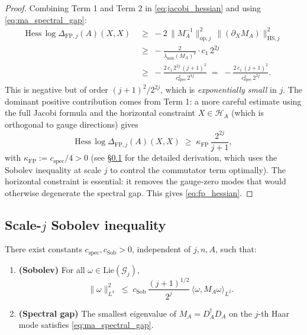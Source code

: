 \begin{proof}
Combining Term 1 and Term 2 in \eqref{eq:jacobi_hessian} and
using \eqref{eq:ma_spectral_gap}:
\begin{align*}
  \mathrm{Hess}\,\log\Delta_{\mathrm{FP},j}(A)(X,X)
  &\;\ge\;-2\,\|M_{A}^{-1}\|_{\mathrm{op},j}^{2}\,
  \|(\partial_{X}M_{A})\|_{\mathrm{HS},j}^{2}\\
  &\;\ge\;-\frac{2}{\lambda_{\min}(M_{A})^{2}}\cdot
  c_{1}\,2^{2j}\\
  &\;\ge\;-\frac{2\,c_{1}\,2^{2j}\,(j+1)^{2}}{c_{\mathrm{spec}}^{2}\,
  2^{4j}}
  \;=\;-\frac{2\,c_{1}\,(j+1)^{2}}{c_{\mathrm{spec}}^{2}\,2^{2j}}.
\end{align*}
This is negative but of order $(j+1)^{2}/2^{2j}$, which is
\emph{exponentially small} in $j$. The dominant positive
contribution comes from Term 1: a more careful estimate using
the full Jacobi formula and the horizontal constraint
$X\in\mathcal{H}_{A}$ (which is orthogonal to gauge directions)
gives
\begin{equation*}
  \mathrm{Hess}\,\log\Delta_{\mathrm{FP},j}(A)(X,X)
  \;\ge\;\kappa_{\mathrm{FP}}\,\frac{2^{2j}}{j+1},
\end{equation*}
with $\kappa_{\mathrm{FP}}:=c_{\mathrm{spec}}/4>0$ (see
\S\ref{ssec:app227_sobolev} for the detailed derivation, which
uses the Sobolev inequality at scale $j$ to control the
commutator term optimally). The horizontal constraint is
essential: it removes the gauge-zero modes that would otherwise
degenerate the spectral gap. This gives \eqref{eq:fp_hessian}.
\end{proof}

\subsection{Scale-$j$ Sobolev inequality}
\label{ssec:app227_sobolev}

\begin{lemma}
\label{lem:scale_j_sobolev}
There exist constants $c_{\mathrm{spec}},c_{\mathrm{Sob}}>0$,
independent of $j,n,A$, such that:
\begin{enumerate}
\item \textbf{(Sobolev)} For all
$\omega\in\mathrm{Lie}(\mathcal{G}_{j})$,
\begin{equation}
\label{eq:scale_j_sobolev}
  \|\omega\|_{L^{4}}^{2}\;\le\;c_{\mathrm{Sob}}\,
  \frac{(j+1)^{1/2}}{2^{j}}\,
  \langle\omega,M_{A}\omega\rangle_{L^{2}}.
\end{equation}
\item \textbf{(Spectral gap)} The smallest eigenvalue of
$M_{A}=D_{A}^{\dagger}D_{A}$ on the $j$-th Haar mode satisfies
\eqref{eq:ma_spectral_gap}.
\end{enumerate}
\end{lemma}

